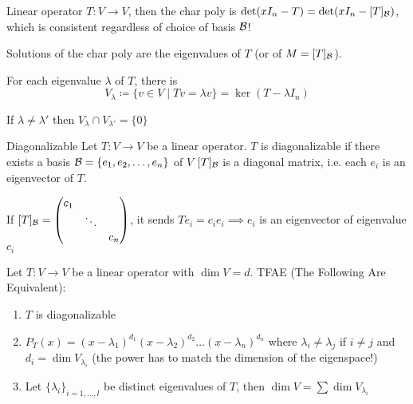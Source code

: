 
\begin{recall}
    Linear operator \(T: V \to V\), then the char poly is \(\det (x I_n - T) = \det (xI_n -[T]_{\mathcal{B}})\), which is consistent regardless of choice of basis \(\mathcal{B}\)!

    Solutions of the char poly are the eigenvalues of \(T\) (or of \(M = [T]_{\mathcal{B}}\)).

    For each eigenvalue \(\lambda\) of \(T\), there is \[
        V_\lambda \coloneqq \{v \in V \mid Tv = \lambda v\} = \ker (T - \lambda I_n)
    \]
\end{recall}

\begin{exercise}
    If \(\lambda \neq \lambda '\) then \(V_\lambda \cap V_{\lambda'} = \{0\}\)
\end{exercise}
\begin{definition} {Diagonalizable}
    Let \(T: V \to V\) be a linear operator. \(T\) is diagonalizable if there exists a basis \(\mathcal{B} = \{e_1, e_2, \dots, e_n\}\) of \(V\)  \st \([T]_{\mathcal{B}}\) is a diagonal matrix, i.e. each \(e_i\) is an eigenvector of \(T\).

    If \([T]_{\mathcal{B}} = \begin{pmatrix}
        c_1 &        &     \\
            & \ddots &     \\
            &        & c_n
    \end{pmatrix}\), it sends \(T e_i = c_i e_i \implies e_i\)  is an eigenvector of eigenvalue \(c_i\)
\end{definition}

\begin{proposition}
    Let \(T: V \to V\) be a linear operator with \(\dim V = d\). TFAE (The Following Are Equivalent):
    \begin{enumerate}
        \item \(T\) is diagonalizable
        \item \(P_T(x) = (x - \lambda_1)^{d_1}(x - \lambda_2)^{d_2}\dots (x - \lambda_n)^{d_n}\) where \(\lambda_i \neq \lambda_j\) if \(i \neq j\) and \(d_i = \dim V_{\lambda_i} \)  (the power has to match the dimension of the eigenspace!)
        \item Let \(\{\lambda_i\}_{i = 1, \dots, l}\) be distinct eigenvalues of \(T\), then \(\dim V = \sum \dim V_{\lambda_i}\)
    \end{enumerate}
\end{proposition}

